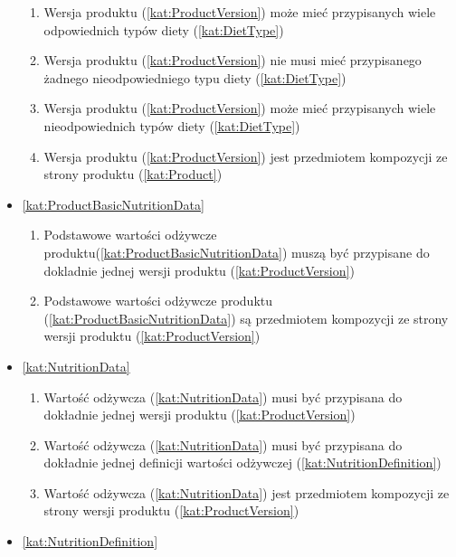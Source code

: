 \begin{itemize}[label={\textbf{Reguły dla}}, wide, labelwidth=!, labelindent=0pt]
\begin{enumerate}[label={\textbf{REG/\protect\threedigits{\arabic{enumi}}}}, wide, labelwidth=!, align=left, leftmargin=3cm, resume]
        \item Wersja produktu (\ref{kat:ProductVersion}) może mieć przypisanych wiele odpowiednich typów diety (\ref{kat:DietType})
        \item Wersja produktu (\ref{kat:ProductVersion}) nie musi mieć przypisanego żadnego nieodpowiedniego typu diety (\ref{kat:DietType})
        \item Wersja produktu (\ref{kat:ProductVersion}) może mieć przypisanych wiele nieodpowiednich typów diety (\ref{kat:DietType})
        \item Wersja produktu (\ref{kat:ProductVersion}) jest przedmiotem kompozycji ze strony produktu (\ref{kat:Product})
    \end{enumerate}
    \item\ref{kat:ProductBasicNutritionData}
    \begin{enumerate}[label={\textbf{REG/\protect\threedigits{\arabic{enumi}}}}, wide, labelwidth=!, align=left, leftmargin=3cm, resume]
        \item Podstawowe wartości odżywcze produktu(\ref{kat:ProductBasicNutritionData}) muszą być przypisane do dokladnie jednej wersji produktu (\ref{kat:ProductVersion})
        \item Podstawowe wartości odżywcze produktu (\ref{kat:ProductBasicNutritionData}) są przedmiotem kompozycji ze strony wersji produktu (\ref{kat:ProductVersion})
    \end{enumerate}
    \item\ref{kat:NutritionData}
    \begin{enumerate}[label={\textbf{REG/\protect\threedigits{\arabic{enumi}}}}, wide, labelwidth=!, align=left, leftmargin=3cm, resume]
        \item Wartość odżywcza (\ref{kat:NutritionData}) musi być przypisana do dokładnie jednej wersji produktu (\ref{kat:ProductVersion})
        \item Wartość odżywcza (\ref{kat:NutritionData}) musi być przypisana do dokładnie jednej definicji wartości odżywczej (\ref{kat:NutritionDefinition})
        \item Wartość odżywcza (\ref{kat:NutritionData}) jest przedmiotem kompozycji ze strony wersji produktu (\ref{kat:ProductVersion})
    \end{enumerate}
    \item\ref{kat:NutritionDefinition}
    \begin{enumerate}[label={\textbf{REG/\protect\threedigits{\arabic{enumi}}}}, wide, labelwidth=!, align=left, leftmargin=3cm, resume]

\end{enumerate}
\end{itemize}
